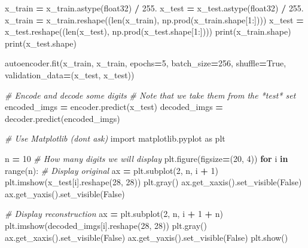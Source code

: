 \documentclass[
  a4paper,
  DIV=11,
  numbers=noendperiod]{scrreprt}
\newenvironment{Shaded}{\begin{snugshade}}{\end{snugshade}}
\newcommand{\BuiltInTok}[1]{#1}
\newcommand{\CommentTok}[1]{\textcolor[rgb]{0.56,0.35,0.01}{\textit{#1}}}
\newcommand{\ControlFlowTok}[1]{\textcolor[rgb]{0.13,0.29,0.53}{\textbf{#1}}}
\newcommand{\DecValTok}[1]{\textcolor[rgb]{0.00,0.00,0.81}{#1}}
\newcommand{\FloatTok}[1]{\textcolor[rgb]{0.00,0.00,0.81}{#1}}
\newcommand{\ImportTok}[1]{#1}
\newcommand{\KeywordTok}[1]{\textcolor[rgb]{0.13,0.29,0.53}{\textbf{#1}}}
\newcommand{\NormalTok}[1]{#1}
\newcommand{\OperatorTok}[1]{\textcolor[rgb]{0.81,0.36,0.00}{\textbf{#1}}}
\newcommand{\StringTok}[1]{\textcolor[rgb]{0.31,0.60,0.02}{#1}}
\newcommand{\VariableTok}[1]{\textcolor[rgb]{0.00,0.00,0.00}{#1}}
\begin{document}
\begin{Shaded}
\begin{Highlighting}[numbers=left,,]
\NormalTok{x\_train }\OperatorTok{=}\NormalTok{ x\_train.astype(}\StringTok{\textquotesingle{}float32\textquotesingle{}}\NormalTok{) }\OperatorTok{/} \FloatTok{255.}
\NormalTok{x\_test }\OperatorTok{=}\NormalTok{ x\_test.astype(}\StringTok{\textquotesingle{}float32\textquotesingle{}}\NormalTok{) }\OperatorTok{/} \FloatTok{255.}
\NormalTok{x\_train }\OperatorTok{=}\NormalTok{ x\_train.reshape((}\BuiltInTok{len}\NormalTok{(x\_train), np.prod(x\_train.shape[}\DecValTok{1}\NormalTok{:])))}
\NormalTok{x\_test }\OperatorTok{=}\NormalTok{ x\_test.reshape((}\BuiltInTok{len}\NormalTok{(x\_test), np.prod(x\_test.shape[}\DecValTok{1}\NormalTok{:])))}
\BuiltInTok{print}\NormalTok{(x\_train.shape)}
\BuiltInTok{print}\NormalTok{(x\_test.shape)}

\NormalTok{autoencoder.fit(x\_train, x\_train,}
\NormalTok{                epochs}\OperatorTok{=}\DecValTok{5}\NormalTok{,}
\NormalTok{                batch\_size}\OperatorTok{=}\DecValTok{256}\NormalTok{,}
\NormalTok{                shuffle}\OperatorTok{=}\VariableTok{True}\NormalTok{,}
\NormalTok{                validation\_data}\OperatorTok{=}\NormalTok{(x\_test, x\_test))}

\CommentTok{\# Encode and decode some digits}
\CommentTok{\# Note that we take them from the *test* set}
\NormalTok{encoded\_imgs }\OperatorTok{=}\NormalTok{ encoder.predict(x\_test)}
\NormalTok{decoded\_imgs }\OperatorTok{=}\NormalTok{ decoder.predict(encoded\_imgs)}

\CommentTok{\# Use Matplotlib (don\textquotesingle{}t ask)}
\ImportTok{import}\NormalTok{ matplotlib.pyplot }\ImportTok{as}\NormalTok{ plt}

\NormalTok{n }\OperatorTok{=} \DecValTok{10}  \CommentTok{\# How many digits we will display}
\NormalTok{plt.figure(figsize}\OperatorTok{=}\NormalTok{(}\DecValTok{20}\NormalTok{, }\DecValTok{4}\NormalTok{))}
\ControlFlowTok{for}\NormalTok{ i }\KeywordTok{in} \BuiltInTok{range}\NormalTok{(n):}
    \CommentTok{\# Display original}
\NormalTok{    ax }\OperatorTok{=}\NormalTok{ plt.subplot(}\DecValTok{2}\NormalTok{, n, i }\OperatorTok{+} \DecValTok{1}\NormalTok{)}
\NormalTok{    plt.imshow(x\_test[i].reshape(}\DecValTok{28}\NormalTok{, }\DecValTok{28}\NormalTok{))}
\NormalTok{    plt.gray()}
\NormalTok{    ax.get\_xaxis().set\_visible(}\VariableTok{False}\NormalTok{)}
\NormalTok{    ax.get\_yaxis().set\_visible(}\VariableTok{False}\NormalTok{)}

    \CommentTok{\# Display reconstruction}
\NormalTok{    ax }\OperatorTok{=}\NormalTok{ plt.subplot(}\DecValTok{2}\NormalTok{, n, i }\OperatorTok{+} \DecValTok{1} \OperatorTok{+}\NormalTok{ n)}
\NormalTok{    plt.imshow(decoded\_imgs[i].reshape(}\DecValTok{28}\NormalTok{, }\DecValTok{28}\NormalTok{))}
\NormalTok{    plt.gray()}
\NormalTok{    ax.get\_xaxis().set\_visible(}\VariableTok{False}\NormalTok{)}
\NormalTok{    ax.get\_yaxis().set\_visible(}\VariableTok{False}\NormalTok{)}
\NormalTok{plt.show()}
\end{Highlighting}
\end{Shaded}
\end{document}
